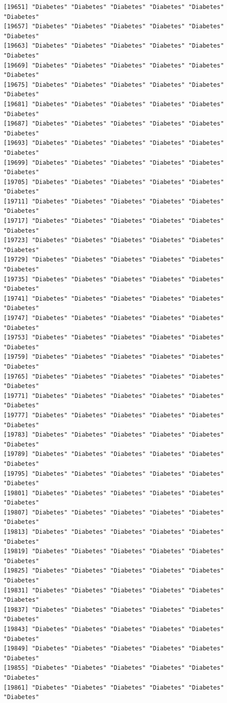 \documentclass[
  letterpaper,
  DIV=11,
  numbers=noendperiod]{scrartcl}
\begin{document}
\begin{verbatim}
[19651] "Diabetes" "Diabetes" "Diabetes" "Diabetes" "Diabetes" "Diabetes"
[19657] "Diabetes" "Diabetes" "Diabetes" "Diabetes" "Diabetes" "Diabetes"
[19663] "Diabetes" "Diabetes" "Diabetes" "Diabetes" "Diabetes" "Diabetes"
[19669] "Diabetes" "Diabetes" "Diabetes" "Diabetes" "Diabetes" "Diabetes"
[19675] "Diabetes" "Diabetes" "Diabetes" "Diabetes" "Diabetes" "Diabetes"
[19681] "Diabetes" "Diabetes" "Diabetes" "Diabetes" "Diabetes" "Diabetes"
[19687] "Diabetes" "Diabetes" "Diabetes" "Diabetes" "Diabetes" "Diabetes"
[19693] "Diabetes" "Diabetes" "Diabetes" "Diabetes" "Diabetes" "Diabetes"
[19699] "Diabetes" "Diabetes" "Diabetes" "Diabetes" "Diabetes" "Diabetes"
[19705] "Diabetes" "Diabetes" "Diabetes" "Diabetes" "Diabetes" "Diabetes"
[19711] "Diabetes" "Diabetes" "Diabetes" "Diabetes" "Diabetes" "Diabetes"
[19717] "Diabetes" "Diabetes" "Diabetes" "Diabetes" "Diabetes" "Diabetes"
[19723] "Diabetes" "Diabetes" "Diabetes" "Diabetes" "Diabetes" "Diabetes"
[19729] "Diabetes" "Diabetes" "Diabetes" "Diabetes" "Diabetes" "Diabetes"
[19735] "Diabetes" "Diabetes" "Diabetes" "Diabetes" "Diabetes" "Diabetes"
[19741] "Diabetes" "Diabetes" "Diabetes" "Diabetes" "Diabetes" "Diabetes"
[19747] "Diabetes" "Diabetes" "Diabetes" "Diabetes" "Diabetes" "Diabetes"
[19753] "Diabetes" "Diabetes" "Diabetes" "Diabetes" "Diabetes" "Diabetes"
[19759] "Diabetes" "Diabetes" "Diabetes" "Diabetes" "Diabetes" "Diabetes"
[19765] "Diabetes" "Diabetes" "Diabetes" "Diabetes" "Diabetes" "Diabetes"
[19771] "Diabetes" "Diabetes" "Diabetes" "Diabetes" "Diabetes" "Diabetes"
[19777] "Diabetes" "Diabetes" "Diabetes" "Diabetes" "Diabetes" "Diabetes"
[19783] "Diabetes" "Diabetes" "Diabetes" "Diabetes" "Diabetes" "Diabetes"
[19789] "Diabetes" "Diabetes" "Diabetes" "Diabetes" "Diabetes" "Diabetes"
[19795] "Diabetes" "Diabetes" "Diabetes" "Diabetes" "Diabetes" "Diabetes"
[19801] "Diabetes" "Diabetes" "Diabetes" "Diabetes" "Diabetes" "Diabetes"
[19807] "Diabetes" "Diabetes" "Diabetes" "Diabetes" "Diabetes" "Diabetes"
[19813] "Diabetes" "Diabetes" "Diabetes" "Diabetes" "Diabetes" "Diabetes"
[19819] "Diabetes" "Diabetes" "Diabetes" "Diabetes" "Diabetes" "Diabetes"
[19825] "Diabetes" "Diabetes" "Diabetes" "Diabetes" "Diabetes" "Diabetes"
[19831] "Diabetes" "Diabetes" "Diabetes" "Diabetes" "Diabetes" "Diabetes"
[19837] "Diabetes" "Diabetes" "Diabetes" "Diabetes" "Diabetes" "Diabetes"
[19843] "Diabetes" "Diabetes" "Diabetes" "Diabetes" "Diabetes" "Diabetes"
[19849] "Diabetes" "Diabetes" "Diabetes" "Diabetes" "Diabetes" "Diabetes"
[19855] "Diabetes" "Diabetes" "Diabetes" "Diabetes" "Diabetes" "Diabetes"
[19861] "Diabetes" "Diabetes" "Diabetes" "Diabetes" "Diabetes" "Diabetes"

\end{verbatim}
\end{document}

